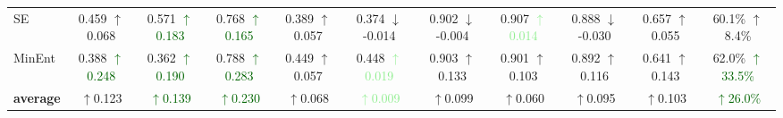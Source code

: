\begin{table*}[ht]
{\begin{tabular}{lcccccccccc}
        SE          & 0.459 \textcolor{medGreen}{$\uparrow$0.068} & 0.571 \textcolor{darkGreen}{$\uparrow$0.183} & 0.768 \textcolor{darkGreen}{$\uparrow$0.165} & 0.389 \textcolor{medGreen}{$\uparrow$0.057} & 0.374 \textcolor{lightRed}{$\downarrow$-0.014} & 0.902 \textcolor{lightRed}{$\downarrow$-0.004} & 0.907 \textcolor{lightGreen}{$\uparrow$0.014} & 0.888 \textcolor{lightRed}{$\downarrow$-0.030} & 0.657 \textcolor{medGreen}{$\uparrow$0.055} & 60.1\% \enspace \textcolor{medGreen}{$\uparrow$8.4\%} \\
        MinEnt      & 0.388 \textcolor{darkGreen}{$\uparrow$0.248} & 0.362 \textcolor{darkGreen}{$\uparrow$0.190} & 0.788 \textcolor{darkGreen}{$\uparrow$0.283} & 0.449 \textcolor{medGreen}{$\uparrow$0.057} & 0.448 \textcolor{lightGreen}{$\uparrow$0.019} & 0.903 \textcolor{medGreen}{$\uparrow$0.133} & 0.901 \textcolor{medGreen}{$\uparrow$0.103} & 0.892 \textcolor{medGreen}{$\uparrow$0.116} & 0.641 \textcolor{medGreen}{$\uparrow$0.143} & 62.0\% \textcolor{darkGreen}{$\uparrow$33.5\%} \\





        
        \midrule
        \textbf{average} &\textcolor{medGreen}{$\uparrow$0.123} & \textcolor{darkGreen}{$\uparrow$0.139} & \textcolor{darkGreen}{$\uparrow$0.230} & \textcolor{medGreen}{$\uparrow$0.068} & \textcolor{lightGreen}{$\uparrow$0.009} & \textcolor{medGreen}{$\uparrow$0.099} & \textcolor{medGreen}{$\uparrow$0.060} & \textcolor{medGreen}{$\uparrow$0.095} & \textcolor{medGreen}{$\uparrow$0.103} & \textcolor{darkGreen}{$\uparrow$26.0\%} \\  %
        
        \bottomrule
    \end{tabular}}
    \label{tab:ablation_aug}
\end{table*}





